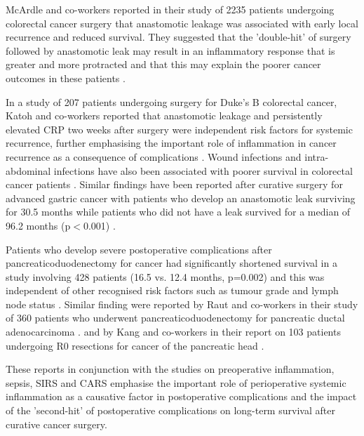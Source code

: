 McArdle and co-workers reported in their study of 2235 patients undergoing colorectal cancer surgery that anastomotic leakage was associated with early local recurrence and reduced survival. 
They suggested that the 'double-hit' of surgery followed by anastomotic leak may result in an inflammatory response that is greater and more protracted and that this may explain the poorer cancer outcomes in these patients \parencite{mcardle_impact_2005}. 

In a study of 207 patients undergoing surgery for Duke's B colorectal cancer, Katoh and co-workers reported that anastomotic leakage and persistently elevated CRP two weeks after surgery were independent risk factors for systemic recurrence, further emphasising the important role of inflammation in cancer recurrence as a consequence of complications \parencite{katoh_anastomotic_2011}. 
Wound infections and intra-abdominal infections have also been associated with poorer survival in colorectal cancer patients \parencite{nespoli_impact_2006}. 
Similar findings have been reported after curative surgery for advanced gastric cancer with patients who develop an anastomotic leak surviving for 30.5 months while patients who did not have a leak survived for a median of 96.2 months (p$<$0.001) \parencite{yoo_negative_2011}. 

Patients who develop severe postoperative complications after pancreaticoduodenectomy for cancer had significantly shortened survival in a study involving 428 patients (16.5 vs. 12.4 months, p=0.002) and this was independent of other recognised risk factors such as tumour grade and lymph node status \parencite{kamphues_postoperative_2012}. 
Similar finding were reported by Raut and co-workers in their study of 360 patients who underwent pancreaticoduodenectomy for pancreatic ductal adenocarcinoma \parencite{raut_impact_2007}. 
and by Kang and co-workers in their report on 103 patients undergoing R0 resections for cancer of the pancreatic head \parencite{kang_detrimental_2009}.

These reports in conjunction with the studies on preoperative inflammation, sepsis, SIRS and CARS emphasise the important role of perioperative systemic inflammation as a causative factor in postoperative complications and the impact of the 'second-hit' of postoperative complications on long-term survival after curative cancer surgery.


